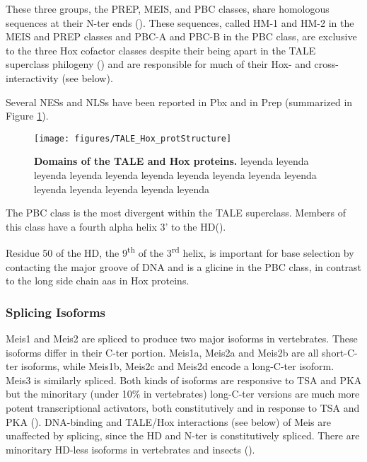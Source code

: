 These three groups, the PREP, MEIS, and PBC classes, share homologous sequences at their \ac{N-ter} ends (\cite{Burglin1998}). These sequences, called HM-1 and HM-2 in the MEIS and PREP classes and PBC-A and PBC-B in the PBC class, are exclusive to the three Hox cofactor classes despite their being apart in the \ac{TALE} superclass philogeny (\cite{Mukherjee2007}) and are responsible for much of their Hox- and cross-interactivity (see below).

Several \acp{NES} and \acp{NLS} have been reported in Pbx and in Prep (summarized in Figure \ref{fig:TALE_Hox_protStructure}).

\begin{figure}[]
  
  \centering
  \texttt{[image: figures/TALE\_Hox\_protStructure]}
  \caption[Domains of the TALE and Hox proteins]{\textbf{Domains of the TALE and Hox proteins.} leyenda leyenda leyenda leyenda leyenda leyenda leyenda leyenda leyenda leyenda leyenda leyenda leyenda leyenda leyenda}
  \label{fig:TALE_Hox_protStructure}
\end{figure}

The PBC class is the most divergent within the \ac{TALE} superclass. Members of this class have a fourth alpha helix 3' to the \ac{HD}(\cite{Mukherjee2007}). 

Residue 50 of the \ac{HD}, the 9\textsuperscript{th} of the 3\textsuperscript{rd} helix, is important for base selection by contacting the major groove of DNA and is a glicine in the PBC class, in contrast to the long side chain \acp{aa} in Hox proteins. %


\subsubsection{Splicing Isoforms}

Meis1 and Meis2 are spliced to produce two major isoforms in vertebrates. These isoforms differ in their \ac{C-ter} portion. Meis1a, Meis2a and Meis2b are all short-\ac{C-ter} isoforms, while Meis1b, Meis2c and Meis2d encode a long-\ac{C-ter} isoform. Meis3 is similarly spliced. Both kinds of isoforms are responsive to \ac{TSA} and \ac{PKA} but the minoritary (under 10\% in vertebrates) long-\ac{C-ter} versions are much more potent transcriptional activators, both constitutively and in response to \ac{TSA} and \ac{PKA} (\cite{Huang2005, Irimia2011}). DNA-binding and TALE/Hox interactions (see below) of Meis are unaffected by splicing, since the \ac{HD} and \ac{N-ter} is constitutively spliced. There are minoritary \ac{HD}-less isoforms in vertebrates and insects (\cite{Irimia2011}). 

